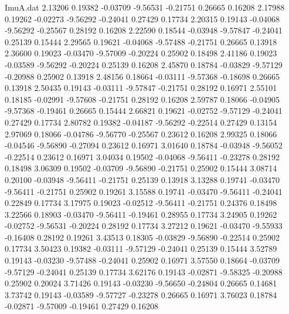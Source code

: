 \begin{filecontents}{ImuA.dat}
   2.13206    0.19382   -0.03709   -9.56531   -0.21751    0.26665    0.16208
   2.17988    0.19262   -0.02273   -9.56292   -0.24041    0.27429    0.17734
   2.20315    0.19143   -0.04068   -9.56292   -0.25567    0.28192    0.16208
   2.22590    0.18544   -0.03948   -9.57847   -0.24041    0.25139    0.15444
   2.29565    0.19621   -0.04068   -9.57488   -0.21751    0.26665    0.13918
   2.36600    0.19023   -0.03470   -9.57009   -0.20224    0.25902    0.18498
   2.41186    0.19023   -0.03589   -9.56292   -0.20224    0.25139    0.16208
   2.45870    0.18784   -0.03829   -9.57129   -0.20988    0.25902    0.13918
   2.48156    0.18664   -0.03111   -9.57368   -0.18698    0.26665    0.13918
   2.50435    0.19143   -0.03111   -9.57847   -0.21751    0.28192    0.16971
   2.55101    0.18185   -0.02991   -9.57608   -0.21751    0.28192    0.16208
   2.59787    0.18066   -0.04905   -9.57368   -0.19461    0.26665    0.15444
   2.66821    0.19621   -0.02752   -9.57129   -0.24041    0.27429    0.17734
   2.80782    0.19382   -0.04187   -9.56292   -0.22514    0.27429    0.13154
   2.97069    0.18066   -0.04786   -9.56770   -0.25567    0.23612    0.16208
   2.99325    0.18066   -0.04546   -9.56890   -0.27094    0.23612    0.16971
   3.01640    0.18784   -0.03948   -9.56052   -0.22514    0.23612    0.16971
   3.04034    0.19502   -0.04068   -9.56411   -0.23278    0.28192    0.18498
   3.06309    0.19502   -0.03709   -9.56890   -0.21751    0.25902    0.15444
   3.08714    0.20100   -0.03948   -9.56411   -0.21751    0.25139    0.13918
   3.13288    0.19741   -0.03470   -9.56411   -0.21751    0.25902    0.19261
   3.15588    0.19741   -0.03470   -9.56411   -0.24041    0.22849    0.17734
   3.17975    0.19023   -0.02512   -9.56411   -0.21751    0.24376    0.18498
   3.22566    0.18903   -0.03470   -9.56411   -0.19461    0.28955    0.17734
   3.24905    0.19262   -0.02752   -9.56531   -0.20224    0.28192    0.17734
   3.27212    0.19621   -0.03470   -9.55933   -0.16408    0.28192    0.19261
   3.43513    0.18305   -0.03829   -9.56890   -0.22514    0.25902    0.17734
   3.50423    0.19382   -0.03111   -9.57129   -0.24041    0.25139    0.15444
   3.52789    0.19143   -0.03230   -9.57488   -0.24041    0.25902    0.16971
   3.57550    0.18664   -0.03709   -9.57129   -0.24041    0.25139    0.17734
   3.62176    0.19143   -0.02871   -9.58325   -0.20988    0.25902    0.20024
   3.71426    0.19143   -0.03230   -9.56650   -0.24804    0.26665    0.14681
   3.73742    0.19143   -0.03589   -9.57727   -0.23278    0.26665    0.16971
   3.76023    0.18784   -0.02871   -9.57009   -0.19461    0.27429    0.16208

\end{filecontents}
